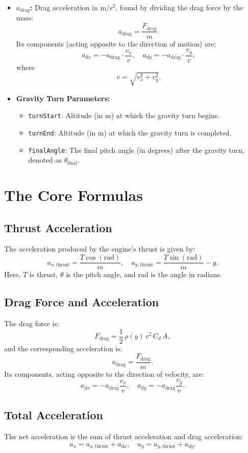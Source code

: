 \documentclass[12pt]{article}
\begin{document}
\begin{itemize}
\[    \]
    \item \textbf{$a_{\text{drag}}$:} Drag acceleration in m/s\(^2\), found by dividing the drag force by the mass:
    \[
      a_{\text{drag}} = \frac{F_{\text{drag}}}{m}.
    \]
    Its components (acting opposite to the direction of motion) are:
    \[
      a_{dx} = -a_{\text{drag}} \cdot \frac{v_x}{v}, \quad a_{dy} = -a_{\text{drag}} \cdot \frac{v_y}{v},
    \]
    where 
    \[
      v = \sqrt{v_x^2 + v_y^2}.
    \]
    \item \textbf{Gravity Turn Parameters:}
    \begin{itemize}
        \item \texttt{turnStart}: Altitude (in m) at which the gravity turn begins.
        \item \texttt{turnEnd}: Altitude (in m) at which the gravity turn is completed.
        \item \texttt{finalAngle}: The final pitch angle (in degrees) after the gravity turn, denoted as \(\theta_{\text{final}}\).
    \end{itemize}
\end{itemize}

\section{The Core Formulas}
\subsection*{Thrust Acceleration}
The acceleration produced by the engine's thrust is given by:
\[
a_{x,\text{thrust}} = \frac{T \cos(\text{rad})}{m}, \quad 
a_{y,\text{thrust}} = \frac{T \sin(\text{rad})}{m} - g.
\]
Here, \(T\) is thrust, \(\theta\) is the pitch angle, and \(\text{rad}\) is the angle in radians.

\subsection*{Drag Force and Acceleration}
The drag force is:
\[
F_{\text{drag}} = \frac{1}{2} \, \rho(y) \, v^2 \, C_d \, A,
\]
and the corresponding acceleration is:
\[
a_{\text{drag}} = \frac{F_{\text{drag}}}{m}.
\]
Its components, acting opposite to the direction of velocity, are:
\[
a_{dx} = -a_{\text{drag}} \frac{v_x}{v}, \quad 
a_{dy} = -a_{\text{drag}} \frac{v_y}{v}.
\]

\subsection*{Total Acceleration}
The net acceleration is the sum of thrust acceleration and drag acceleration:
\[
a_x = a_{x,\text{thrust}} + a_{dx}, \quad 
a_y = a_{y,\text{thrust}} + a_{dy}.
\]
\end{document}
